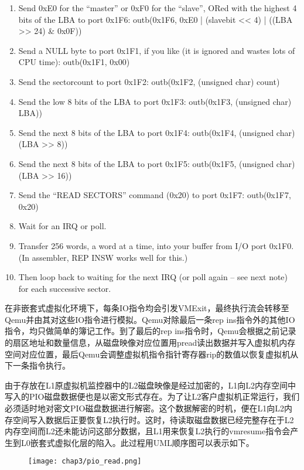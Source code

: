\begin{enumerate}
\item Send 0xE0 for the ``master'' or 0xF0 for the ``slave'', ORed with the
    highest 4 bits of the LBA to port 0x1F6: outb(0x1F6, 0xE0 | (slavebit << 4)
    | ((LBA >> 24) \& 0x0F))
\item Send a NULL byte to port 0x1F1, if you like (it is ignored and wastes lots of CPU time): outb(0x1F1, 0x00)
\item Send the sectorcount to port 0x1F2: outb(0x1F2, (unsigned char) count)
\item Send the low 8 bits of the LBA to port 0x1F3: outb(0x1F3, (unsigned char) LBA))
\item Send the next 8 bits of the LBA to port 0x1F4: outb(0x1F4, (unsigned char)(LBA >> 8))
\item Send the next 8 bits of the LBA to port 0x1F5: outb(0x1F5, (unsigned char)(LBA >> 16))
\item Send the ``READ SECTORS'' command (0x20) to port 0x1F7: outb(0x1F7, 0x20)
\item Wait for an IRQ or poll.
\item Transfer 256 words, a word at a time, into your buffer from I/O port 0x1F0. (In assembler, REP INSW works well for this.)
\item Then loop back to waiting for the next IRQ (or poll again -- see next note) for each successive sector.
\end{enumerate}

在非嵌套式虚拟化环境下，每条IO指令均会引发VMExit，最终执行流会转移至Qemu并由其对这些IO指令进行模拟。Qemu对除最后一条rep ins指令外的其他IO指令，均只做简单的簿记工作。到了最后的rep ins指令时，Qemu会根据之前记录的扇区地址和数量信息，从磁盘映像对应位置用pread读出数据并写入虚拟机内存空间对应位置，最后Qemu会调整虚拟机指令指针寄存器rip的数值以恢复虚拟机从下一条指令执行。

由于存放在L1原虚拟机监控器中的L2磁盘映像是经过加密的，L1向L2内存空间中写入的PIO磁盘数据便也是以密文形式存在。为了让L2客户虚拟机正常运行，我们必须适时地对密文PIO磁盘数据进行解密。这个数据解密的时机，便在L1向L2内存空间写入数据后正要恢复L2执行时。这时，待读取磁盘数据已经完整存在于L2内存空间而L2还未能访问这部分数据，且L1用来恢复L2执行的vmresume指令会产生到L0嵌套式虚拟化层的陷入。此过程用UML顺序图可以表示如下。

\begin{figure}[!htbp]
  \centering
  \texttt{[image: chap3/pio\_read.png]}
\end{figure}

